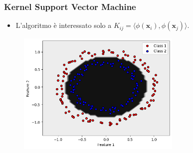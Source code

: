 \documentclass{beamer}
\begin{document}
\begin{frame}
  \frametitle{Kernel Support Vector Machine}
  
  \begin{itemize}
    \item L'algoritmo è interessato solo a $K_{ij}=\langle \phi(\mathbf{x}_i), \phi(\mathbf{x}_j) \rangle$.

  \end{itemize}
     
        \begin{figure}
          \includegraphics[width=0.7\textwidth]{images/separatedcircle.png}
        \end{figure}
        
\end{frame}
\end{document}
